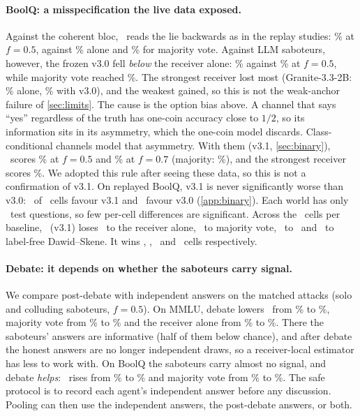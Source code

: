 \paragraph{BoolQ: a misspecification the live data exposed.} Against the coherent bloc, \race\ reads the lie backwards as in the replay studies: \liveBoolqCohRaceFive\% at $f=0.5$, against \liveBoolqCohSelfFive\% alone and \liveBoolqCohMajFive\% for majority vote. Against LLM saboteurs, however, the frozen v3.0 fell \emph{below} the receiver alone: \liveBoolqLlmVthreeFive\% against \liveBoolqLlmSelfFive\% at $f=0.5$, while majority vote reached \liveBoolqLlmMajFive\%. The strongest receiver lost most (Granite-3.3-2B: \liveGraniteSelf\% alone, \liveGraniteVthree\% with v3.0), and the weakest gained, so this is not the weak-anchor failure of \cref{sec:limits}. The cause is the option bias above. A channel that says ``yes'' regardless of the truth has one-coin accuracy close to $1/2$, so its information sits in its asymmetry, which the one-coin model discards. Class-conditional channels model that asymmetry. With them (v3.1, \cref{sec:binary}), \race\ scores \liveBoolqLlmRaceFive\% at $f=0.5$ and \liveBoolqLlmRaceSeven\% at $f=0.7$ (majority: \liveBoolqLlmMajSeven\%), and the strongest receiver scores \liveGraniteRace\%. We adopted this rule after seeing these data, so this is not a confirmation of v3.1. On replayed BoolQ, v3.1 is never significantly worse than v3.0: \binaryReplayWins\ of \binaryReplayCells\ cells favour v3.1 and \binaryReplayLosses\ favour v3.0 (\cref{app:binary}). Each world has only \nLiveTestTasks\ test questions, so few per-cell differences are significant. Across the \liveCellsPerBaseline\ cells per baseline, \race\ (v3.1) loses \liveLossesSelf\ to the receiver alone, \liveLossesMaj\ to majority vote, \liveLossesAip\ to \aip\ and \liveLossesDs\ to label-free Dawid--Skene. It wins \liveWinsSelf, \liveWinsMaj, \liveWinsAip\ and \liveWinsDs\ cells respectively.

\paragraph{Debate: it depends on whether the saboteurs carry signal.} We compare post-debate with independent answers on the matched attacks (solo and colluding saboteurs, $f=0.5$). On MMLU, debate lowers \race\ from \liveIndMmluRace\% to \liveDebMmluRace\%, majority vote from \liveIndMmluMaj\% to \liveDebMmluMaj\% and the receiver alone from \liveIndMmluSelf\% to \liveDebMmluSelf\%. There the saboteurs' answers are informative (half of them below chance), and after debate the honest answers are no longer independent draws, so a receiver-local estimator has less to work with. On BoolQ the saboteurs carry almost no signal, and debate \emph{helps}: \race\ rises from \liveIndBoolqRace\% to \liveDebBoolqRace\% and majority vote from \liveIndBoolqMaj\% to \liveDebBoolqMaj\%. The safe protocol is to record each agent's independent answer before any discussion. Pooling can then use the independent answers, the post-debate answers, or both.

